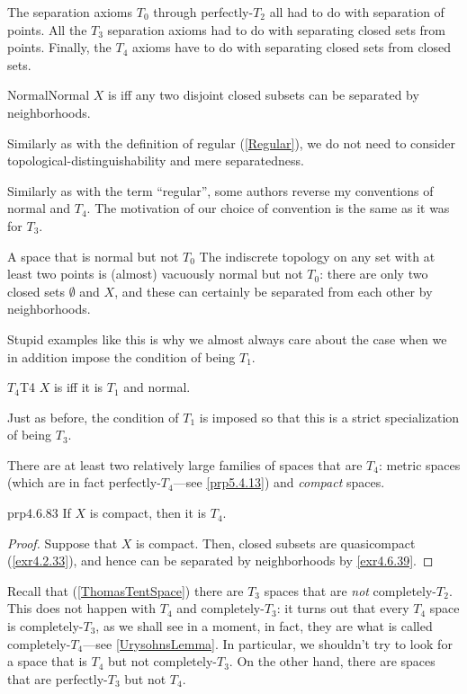 The separation axioms $T_0$ through perfectly-$T_2$ all had to do with separation of points.  All the $T_3$ separation axioms had to do with separating closed sets from points.  Finally, the $T_4$ axioms have to do with separating closed sets from closed sets.
\begin{dfn}{Normal}{Normal}
$X$ is  iff any two disjoint closed subsets can be separated by neighborhoods.
\begin{rmk}
Similarly as with the definition of regular (\cref{Regular}), we do not need to consider topological-distinguishability and mere separatedness.
\end{rmk}
\begin{rmk}
Similarly as with the term ``regular'', some authors reverse my conventions of normal and $T_4$.  The motivation of our choice of convention is the same as it was for $T_3$.
\end{rmk}
\end{dfn}
\begin{exm}{A space that is normal but not $T_0$}{}
The indiscrete topology on any set with at least two points is (almost) vacuously normal but not $T_0$:  there are only two closed sets $\emptyset$ and $X$, and these can certainly be separated from each other by neighborhoods.
\end{exm}
Stupid examples like this is why we almost always care about the case when we in addition impose the condition of being $T_1$.
\begin{dfn}{$T_4$}{T4}
$X$ is  iff it is $T_1$ and normal.
\begin{rmk}
Just as before, the condition of $T_1$ is imposed so that this is a strict specialization of being $T_3$.
\end{rmk}
\end{dfn}
There are at least two relatively large families of spaces that are $T_4$:  metric spaces (which are in fact perfectly-$T_4$---see \cref{prp5.4.13}) and \emph{compact} spaces.
\begin{prp}{}{prp4.6.83}
If $X$ is compact, then it is $T_4$.
\begin{proof}
Suppose that $X$ is compact.  Then, closed subsets are quasicompact (\cref{exr4.2.33}), and hence can be separated by neighborhoods by \cref{exr4.6.39}.
\end{proof}
\end{prp}
Recall that (\cref{ThomasTentSpace}) there are $T_3$ spaces that are \emph{not} completely-$T_2$.  This does not happen with $T_4$ and completely-$T_3$:  it turns out that every $T_4$ space is completely-$T_3$, as we shall see in a moment, in fact, they are what is called completely-$T_4$---see \cref{UrysohnsLemma}.  In particular, we shouldn't try to look for a space that is $T_4$ but not completely-$T_3$.  On the other hand, there are spaces that are perfectly-$T_3$ but not $T_4$.
